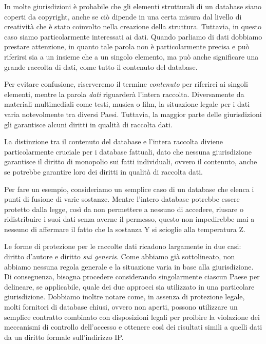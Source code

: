 In molte giurisdizioni è probabile che gli elementi strutturali di un database siano coperti da copyright, anche se ciò dipende in una certa misura dal livello di creatività che è stato coinvolto nella creazione della struttura. Tuttavia, in questo caso siamo particolarmente interessati ai dati. Quando parliamo di dati dobbiamo prestare attenzione, in quanto tale parola non è particolarmente precisa e può riferirsi sia a un insieme che a un singolo elemento, ma può anche significare una grande raccolta di dati, come tutto il contenuto del database.

Per evitare confusione, riserveremo il termine \textit{contenuto} per riferirci ai singoli elementi, mentre la parola \textit{dati} riguarderà l'intera raccolta. Diversamente da materiali multimediali come testi, musica o film, la situazione legale per i dati varia notevolmente tra diversi Paesi. Tuttavia, la maggior parte delle giurisdizioni gli garantisce alcuni diritti in qualità di raccolta dati.

La distinzione tra il contenuto del database e l'intera raccolta diviene particolarmente cruciale per i database fattuali, dato che nessuna giurisdizione garantisce il diritto di monopolio sui fatti individuali, ovvero il contenuto, anche se potrebbe garantire loro dei diritti in qualità di raccolta dati.

Per fare un esempio, consideriamo un semplice caso di un database che elenca i punti di fusione di varie sostanze. Mentre l'intero database potrebbe essere protetto dalla legge, così da non permettere a nessuno di accedere, riusare o ridistribuire i suoi dati senza averne il permesso, questo non impedirebbe mai a nessuno di affermare il fatto che la sostanza Y si scioglie alla temperatura Z.

Le forme di protezione per le raccolte dati ricadono largamente in due casi: diritto d'autore e diritto \textit{sui generis}. Come abbiamo già sottolineato, non abbiamo nessuna regola generale e la situazione varia in base alla giurisdizione. Di conseguenza, bisogna procedere considerando singolarmente ciascun Paese per delineare, se applicabile, quale dei due approcci sia utilizzato in una particolare giurisdizione. Dobbiamo inoltre notare come, in assenza di protezione legale, molti fornitori di database chiusi, ovvero non aperti, possono utilizzare un semplice contratto combinato con disposizioni legali per proibire la violazione dei meccanismi di controllo dell'accesso e ottenere così dei risultati simili a quelli dati da un diritto formale sull'indirizzo IP.

